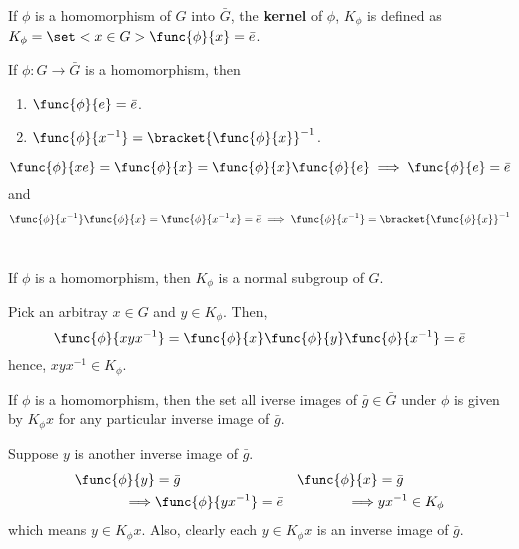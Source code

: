 \begin{definition}
    If \(\phi\) is a homomorphism of \(G\) into \(\bar{G}\), the \textbf{kernel} of \(\phi\), \(K_{\phi}\) is defined as \(K_{\phi} = \set<x \in G>{\func{\phi}{x} = \bar{e}}\).
\end{definition}

\begin{lemma}
    If \(\phi: G \to \bar{G}\) is a homomorphism, then  
    \begin{enumerate}
        \item \(\func{\phi}{e} = \bar{e}\).
        \item \(\func{\phi}{x^{-1}} = \bracket{\func{\phi}{x}}^{-1}\).
    \end{enumerate}
\end{lemma}

\begin{prooflemma}
    \begin{equation*}
        \func{\phi}{xe} = \func{\phi}{x} = \func{\phi}{x}\func{\phi}{e} \implies \func{\phi}{e} = \bar{e}
    \end{equation*}
    and 
    \begin{equation*}
        \func{\phi}{x^{-1}} \func{\phi}{x} = \func{\phi}{x^{-1}x} = \bar{e} \implies \func{\phi}{x^{-1}} = \bracket{\func{\phi}{x}}^{-1}
    \end{equation*}
    \
\end{prooflemma}

\begin{lemma}
    If \(\phi\) is a homomorphism, then \(K_{\phi}\) is a normal subgroup of \(G\).
\end{lemma}

\begin{prooflemma}
    Pick an arbitray \(x \in G\) and \(y \in K_{\phi}\). Then, 
    \begin{equation*}
        \func{\phi}{x y x^{-1}} = \func{\phi}{x} \func{\phi}{y} \func{\phi}{x^{-1}} = \bar{e}
    \end{equation*}
    hence, \(xyx^{-1} \in K_{\phi}\).
\end{prooflemma}

\begin{lemma}\label{lm:homomorphismInverse}
    If \(\phi\) is a homomorphism, then the set all iverse images of \(\bar{g} \in \bar{G}\) under \(\phi\) is given by \(K_{\phi} x\) for any particular inverse image of \(\bar{g}\).
\end{lemma}

\begin{prooflemma}
    Suppose \(y\) is another inverse image of \(\bar{g}\). 
    \begin{align*}
        \func{\phi}{y} &= \bar{g} & \func{\phi}{x} &=\bar{g}\\
        \implies & \func{\phi}{yx^{-1}} = \bar{e} &\implies& yx^{-1} \in K_{\phi}
    \end{align*}
    which means \(y \in K_{\phi}{x}\). Also, clearly each \(y \in K_{\phi}{x}\) is an inverse image of \(\bar{g}\).
\end{prooflemma}

